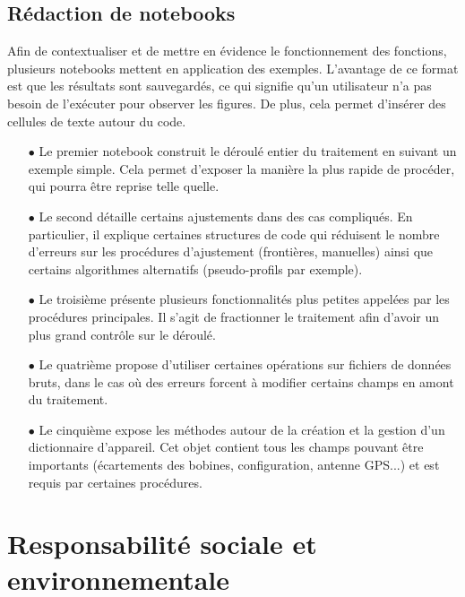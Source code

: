 \documentclass[12pt]{article}
\begin{document}
\subsection{Rédaction de notebooks}

    Afin de contextualiser et de mettre en évidence le fonctionnement des fonctions, plusieurs notebooks mettent en application des exemples. L'avantage de ce format est que les résultats sont sauvegardés, ce qui signifie qu'un utilisateur n'a pas besoin de l'exécuter pour observer les figures. De plus, cela permet d'insérer des cellules de texte autour du code.

    \begin{enumerate}
        \item[$\bullet$] Le premier notebook construit le déroulé entier du traitement en suivant un exemple simple. Cela permet d'exposer la manière la plus rapide de procéder, qui pourra être reprise telle quelle.

        \item[$\bullet$] Le second détaille certains ajustements dans des cas compliqués. En particulier, il explique certaines structures de code qui réduisent le nombre d'erreurs sur les procédures d'ajustement (frontières, manuelles) ainsi que certains algorithmes alternatifs (pseudo-profils par exemple).

        \item[$\bullet$] Le troisième présente plusieurs fonctionnalités plus petites appelées par les procédures principales. Il s'agit de fractionner le traitement afin d'avoir un plus grand contrôle sur le déroulé.
        
        \item[$\bullet$] Le quatrième propose d'utiliser certaines opérations sur fichiers de données bruts, dans le cas où des erreurs forcent à modifier certains champs en amont du traitement.

        \item[$\bullet$] Le cinquième expose les méthodes autour de la création et la gestion d'un dictionnaire d'appareil. Cet objet contient tous les champs pouvant être importants (écartements des bobines, configuration, antenne GPS...) et est requis par certaines procédures.
    \end{enumerate}

\section{Responsabilité sociale et environnementale}
\end{document}
